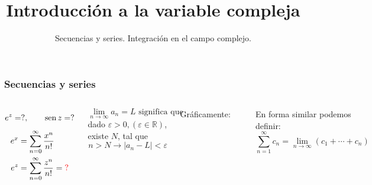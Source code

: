 \documentclass[9pt, aspectratio=169]{beamer}
\title{Introducción a la variable compleja}
\subtitle{Secuencias y series. Integración en el campo complejo.}
\begin{document}
\maketitle

\begin{frame}[t]
    \frametitle{Secuencias y series}
 \begin{columns}[t]
     \[ e^z = ?, \qquad \operatorname{sen} z = ? \]
   \begin{align*} 
      e^x &= \sum_{n = 0}^{\infty} \frac{x^n}{n!}  \\
      e^z &= \sum_{n = 0}^{\infty} \frac{z^n}{n!} = \textcolor{red}{?} \\
  \end{align*}
  \begin{definition}
      \vspace{-0.5em}
      \[ \lim_{n \rightarrow \infty} a_n = L \text{ significa que} \]
      dado $\varepsilon > 0, (\varepsilon \in \mathbb{R})$, existe $N$, tal que \vspace{-0.5em}
      \[ n > N \rightarrow |a_n - L| < \varepsilon \]
    
  \end{definition}

    Gráficamente:
    \begin{center}
    \includegraphics[scale=0.35]{figs/fig-06.pdf}
    \end{center}
    En forma similar podemos definir:
    \[ \sum_{n = 1}^{\infty} c_n = \lim_{n \rightarrow \infty} (c_1 + \cdots + c_n) \]


\end{columns}
\end{frame}
\end{document}
